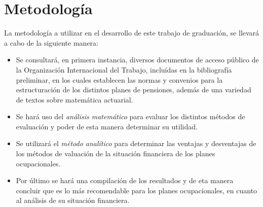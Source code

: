 \documentclass[12pt,letterpaper,titlepage]{article}
\begin{document}
\newpage

\section{Metodología}

La metodología a utilizar en el desarrollo de este trabajo de graduación, se llevará a cabo de la siguiente manera:

\begin{itemize}
	\item Se consultará, en primera instancia, diversos documentos de acceso público de la Organización Internacional del Trabajo, incluídas en la bibliografía preliminar,  en los cuales establecen las normas y convenios para la estructuración de los distintos planes de pensiones, además de una variedad de textos sobre matemática actuarial.
	
	\item Se hará uso del \textit{análisis matemático} para evaluar los distintos métodos de evaluación y poder de esta manera determinar su utilidad.
	 
	\item Se utilizará el \textit{método analítico} para determinar las ventajas y desventajas de los métodos de valuación de la situación financiera de los planes ocupacionales.
	
	\item Por último se hará una compilación de los resultados y de eta manera concluir que es lo más recomendable para los planes ocupacionales, en cuanto al análisis de su situación financiera.
\end{itemize}


\newpage
\end{document}
